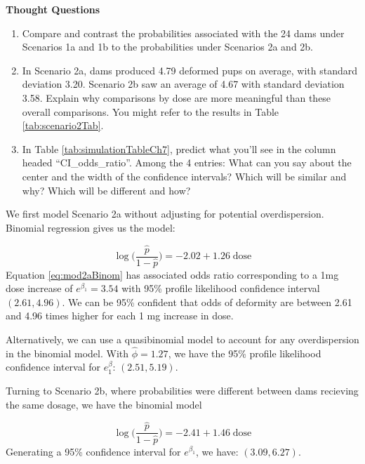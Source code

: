 \documentclass[
]{krantz}
\begin{document}
\vspace{5mm}

\textbf{Thought Questions}

\begin{enumerate}
\def\labelenumi{\arabic{enumi}.}
\setcounter{enumi}{5}
\item
  Compare and contrast the probabilities associated with the 24 dams under Scenarios 1a and 1b to the probabilities under Scenarios 2a and 2b.
\item
  In Scenario 2a, dams produced 4.79 deformed pups on average, with standard deviation 3.20. Scenario 2b saw an average of 4.67 with standard deviation 3.58. Explain why comparisons by dose are more meaningful than these overall comparisons. You might refer to the results in Table \ref{tab:scenario2Tab}.
\item
  In Table \ref{tab:simulationTableCh7}, predict what you'll see in the column headed ``CI\_odds\_ratio''. Among the 4 entries: What can you say about the center and the width of the confidence intervals? Which will be similar and why? Which will be different and how?
\end{enumerate}

We first model Scenario 2a without adjusting for potential overdispersion. Binomial regression gives us the model:

\begin{equation}
  \log\bigg( \frac{\hat{p}}{1-\hat{p}} \bigg) = -2.02 + 1.26\;\textrm{dose}
  \label{eq:mod2aBinom}
\end{equation}
Equation \eqref{eq:mod2aBinom} has associated odds ratio corresponding to a 1mg dose increase of \(e^{\beta_1} = 3.54\) with 95\% profile likelihood confidence interval \((2.61, 4.96)\). We can be 95\% confident that odds of deformity are between 2.61 and 4.96 times higher for each 1 mg increase in dose.

Alternatively, we can use a quasibinomial model to account for any overdispersion in the binomial model. With \(\widehat{\phi} = 1.27\), we have the 95\% profile likelihood confidence interval for \(e^\beta_1\): \((2.51, 5.19)\).

Turning to Scenario 2b, where probabilities were different between dams recieving the same dosage, we have the binomial model

\begin{equation*}
  \log\bigg( \frac{\hat{p}}{1-\hat{p}} \bigg) = -2.41 + 1.46\;\textrm{dose}
\end{equation*}
Generating a 95\% confidence interval for \(e^{\beta_1}\), we have: \((3.09, 6.27)\).
\end{document}
